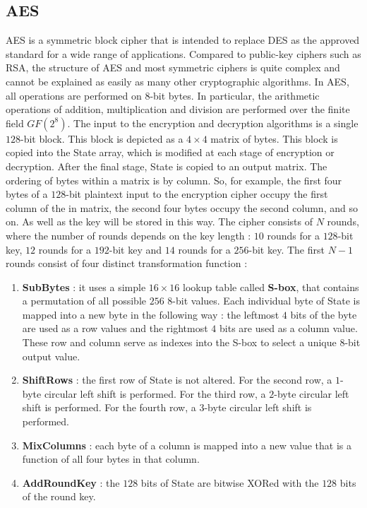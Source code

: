 \documentclass[11pt]{article}
\begin{document}
\subsection{AES}
AES is a symmetric block cipher that is intended to replace DES as the approved standard for a wide range of applications. Compared to public-key ciphers such as RSA, the structure of AES and most symmetric ciphers is quite complex and cannot be explained as easily as many other cryptographic algorithms. In AES, all operations are performed on $8$-bit bytes. In particular, the arithmetic operations of addition, multiplication and division are performed over the finite field $GF(2^8)$. The input to the encryption and decryption algorithms is a single $128$-bit block. This block is depicted as a $4 \times 4$ matrix of bytes. This block is copied into the State array, which is modified at each stage of encryption or decryption. After the final stage, State is copied to an output matrix. The ordering of bytes within a matrix is by column. So, for example, the first four bytes of a $128$-bit plaintext input to the encryption cipher occupy the first column of the in matrix, the second four bytes occupy the second column, and so on. As well as the key will be stored in this way. The cipher consists of $N$ rounds, where the number of rounds depends on the key length : $10$ rounds for a $128$-bit key, $12$ rounds for a $192$-bit key and $14$ rounds for a $256$-bit key. The first $N - 1$ rounds consist of four distinct transformation function :
\begin{enumerate}
\item \textbf{SubBytes} : it uses a simple $16 \times 16$ lookup table called \textbf{S-box}, that contains a permutation of all possible $256$ $8$-bit values. Each individual byte of State is mapped into a new byte in the following way : the leftmost $4$ bits of the byte are used as a row values and the rightmost $4$ bits are used as a column value. These row and column serve as indexes into the S-box to select a unique $8$-bit output value. 
\item \textbf{ShiftRows} : the first row of State is not altered. For the second row, a $1$-byte circular left shift is performed. For the third row, a $2$-byte circular left shift is performed. For the fourth row, a $3$-byte circular left shift is performed.
\item \textbf{MixColumns} : each byte of a column is mapped into a new value that is a function of all four bytes in that column.
\item \textbf{AddRoundKey} : the $128$ bits of State are bitwise XORed with the $128$ bits of the round key. 
\end{enumerate}
\end{document}
